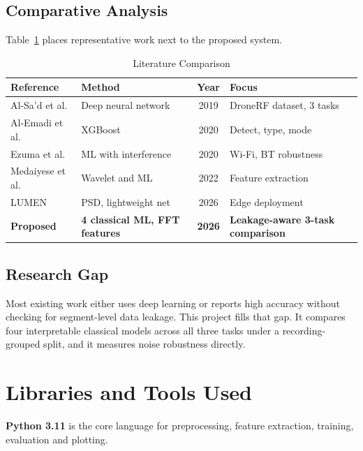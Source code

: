 \documentclass[11pt,conference,a4paper]{IEEEtran}
\begin{document}
\subsection{Comparative Analysis}
Table~\ref{tab:litcompare} places representative work next to the proposed
system.

\begin{table}[t]
\centering
\caption{Literature Comparison}
\label{tab:litcompare}
\small
\begin{tabular}{|p{1.5cm}|p{1.9cm}|c|p{1.7cm}|}
\hline
\textbf{Reference} & \textbf{Method} & \textbf{Year} & \textbf{Focus} \\
\hline
Al-Sa'd et al. \cite{alsad_fgcs} & Deep neural network & 2019 & DroneRF dataset, 3 tasks \\
\hline
Al-Emadi et al. \cite{alemadi_xgb} & XGBoost & 2020 & Detect, type, mode \\
\hline
Ezuma et al. \cite{ezuma_interf} & ML with interference & 2020 & Wi-Fi, BT robustness \\
\hline
Medaiyese et al. \cite{medaiyese_wavelet} & Wavelet and ML & 2022 & Feature extraction \\
\hline
LUMEN \cite{lumen_sensors} & PSD, lightweight net & 2026 & Edge deployment \\
\hline
\textbf{Proposed} & \textbf{4 classical ML, FFT features} & \textbf{2026} & \textbf{Leakage-aware 3-task comparison} \\
\hline
\end{tabular}
\end{table}

\subsection{Research Gap}
Most existing work either uses deep learning or reports high accuracy without
checking for segment-level data leakage. This project fills that gap. It
compares four interpretable classical models across all three tasks under a
recording-grouped split, and it measures noise robustness directly.

\section{Libraries and Tools Used}
\textbf{Python 3.11} is the core language for preprocessing, feature extraction,
training, evaluation and plotting.
\end{document}
